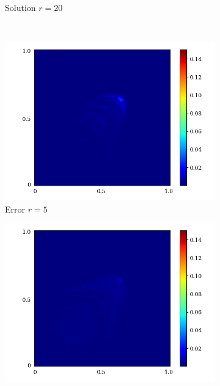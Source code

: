 \begin{figure}[ht!]
\begin{center}
\begin{subfigure}[b]{0.20\textwidth}
\begin{center}
       \end{center}
            \caption{Solution $r = 20$}
        \end{subfigure}\\  
        \begin{subfigure}[b]{0.20\textwidth}
            \begin{center}
                \includegraphics[trim = {0, 0, 3cm, 0}, clip, width=\textwidth]{Pictures/X-rom-LE-SAE-5-abs-err.png}
            \end{center}
            \caption{Error $r = 5$}
        \end{subfigure}  
        \begin{subfigure}[b]{0.20\textwidth}
            \begin{center}
                \includegraphics[trim = {0, 0, 3cm, 0}, clip, width=\textwidth]{Pictures/X-rom-LE-SAE-10-abs-err.png}

\end{center}
\end{subfigure}
\end{center}
\end{figure}
